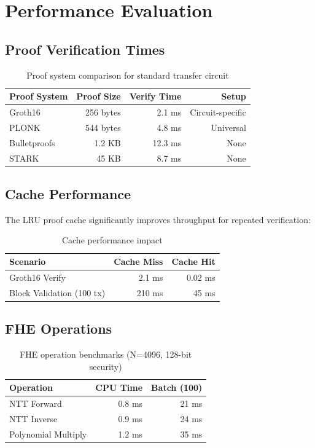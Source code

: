 \documentclass[11pt,a4paper]{article}
\begin{document}
\section{Performance Evaluation}

\subsection{Proof Verification Times}

\begin{table}[h]
\centering
\begin{tabular}{lrrr}
\toprule
\textbf{Proof System} & \textbf{Proof Size} & \textbf{Verify Time} & \textbf{Setup} \\
\midrule
Groth16 & 256 bytes & 2.1 ms & Circuit-specific \\
PLONK & 544 bytes & 4.8 ms & Universal \\
Bulletproofs & 1.2 KB & 12.3 ms & None \\
STARK & 45 KB & 8.7 ms & None \\
\bottomrule
\end{tabular}
\caption{Proof system comparison for standard transfer circuit}
\end{table}

\subsection{Cache Performance}

The LRU proof cache significantly improves throughput for repeated verification:

\begin{table}[h]
\centering
\begin{tabular}{lrr}
\toprule
\textbf{Scenario} & \textbf{Cache Miss} & \textbf{Cache Hit} \\
\midrule
Groth16 Verify & 2.1 ms & 0.02 ms \\
Block Validation (100 tx) & 210 ms & 45 ms \\
\bottomrule
\end{tabular}
\caption{Cache performance impact}
\end{table}

\subsection{FHE Operations}

\begin{table}[h]
\centering
\begin{tabular}{lrr}
\toprule
\textbf{Operation} & \textbf{CPU Time} & \textbf{Batch (100)} \\
\midrule
NTT Forward & 0.8 ms & 21 ms \\
NTT Inverse & 0.9 ms & 24 ms \\
Polynomial Multiply & 1.2 ms & 35 ms \\
\bottomrule
\end{tabular}
\caption{FHE operation benchmarks (N=4096, 128-bit security)}
\end{table}
\end{document}
